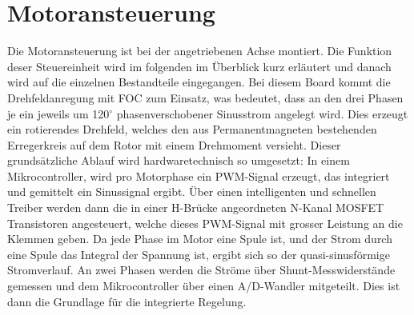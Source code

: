 \section{Motoransteuerung}
\label{HW_Motoransteuerung}
Die Motoransteuerung ist bei der angetriebenen Achse montiert. Die Funktion deser Steuereinheit wird im folgenden im Überblick kurz erläutert und danach wird auf die einzelnen Bestandteile eingegangen.
Bei diesem Board kommt die Drehfeldanregung mit FOC zum Einsatz, was bedeutet, dass an den drei Phasen je ein jeweils um 120\(^\circ\) phasenverschobener Sinusstrom angelegt wird. Dies erzeugt ein rotierendes Drehfeld, welches den aus Permanentmagneten bestehenden Erregerkreis auf dem Rotor mit einem Drehmoment versieht. Dieser grundsätzliche Ablauf wird hardwaretechnisch so umgesetzt:
In einem Mikrocontroller, wird pro Motorphase ein PWM-Signal erzeugt, das integriert und gemittelt ein Sinussignal ergibt. Über einen intelligenten und schnellen Treiber werden dann die in einer H-Brücke angeordneten N-Kanal MOSFET Transistoren angesteuert, welche dieses PWM-Signal mit grosser Leistung an die Klemmen geben. Da jede Phase im Motor eine Spule ist, und der Strom durch eine Spule das Integral der Spannung ist, ergibt sich so der quasi-sinusförmige Stromverlauf.
An zwei Phasen werden die Ströme über Shunt-Messwiderstände gemessen und dem Mikrocontroller über einen A/D-Wandler mitgeteilt. Dies ist dann die Grundlage für die integrierte Regelung.

